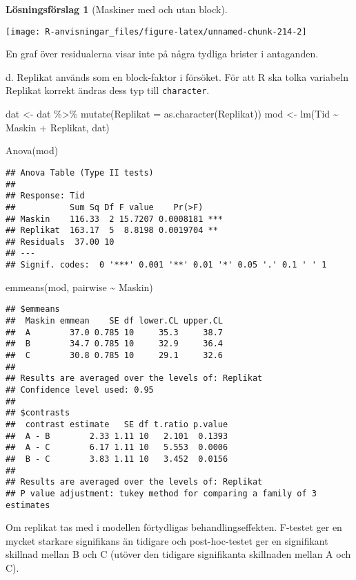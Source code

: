 \documentclass[
]{book}
\newenvironment{Shaded}{\begin{snugshade}}{\end{snugshade}}
\newcommand{\AttributeTok}[1]{\textcolor[rgb]{0.77,0.63,0.00}{#1}}
\newcommand{\FunctionTok}[1]{\textcolor[rgb]{0.00,0.00,0.00}{#1}}
\newcommand{\NormalTok}[1]{#1}
\newcommand{\OtherTok}[1]{\textcolor[rgb]{0.56,0.35,0.01}{#1}}
\newcommand{\SpecialCharTok}[1]{\textcolor[rgb]{0.00,0.00,0.00}{#1}}
\theoremstyle{definition}
\theoremstyle{definition}
\theoremstyle{definition}
\theoremstyle{definition}
\newtheorem{hypothesis}{Lösningsförslag}[chapter]
\theoremstyle{remark}
\begin{document}
\begin{hypothesis}[Maskiner med och utan block]
\begin{center}\texttt{[image: R-anvisningar\_files/figure-latex/unnamed-chunk-214-2]} \end{center}

En graf över residualerna visar inte på några tydliga brister i antaganden.

d. Replikat används som en block-faktor i försöket. För att R ska tolka variabeln Replikat korrekt ändras dess typ till \texttt{character}.

\begin{Shaded}
\begin{Highlighting}[]
\NormalTok{dat }\OtherTok{\textless{}{-}}\NormalTok{ dat }\SpecialCharTok{\%\textgreater{}\%} \FunctionTok{mutate}\NormalTok{(}\AttributeTok{Replikat =} \FunctionTok{as.character}\NormalTok{(Replikat))}
\NormalTok{mod }\OtherTok{\textless{}{-}} \FunctionTok{lm}\NormalTok{(Tid }\SpecialCharTok{\textasciitilde{}}\NormalTok{ Maskin }\SpecialCharTok{+}\NormalTok{ Replikat, dat)}

\FunctionTok{Anova}\NormalTok{(mod)}
\end{Highlighting}
\end{Shaded}

\begin{verbatim}
## Anova Table (Type II tests)
## 
## Response: Tid
##           Sum Sq Df F value    Pr(>F)    
## Maskin    116.33  2 15.7207 0.0008181 ***
## Replikat  163.17  5  8.8198 0.0019704 ** 
## Residuals  37.00 10                      
## ---
## Signif. codes:  0 '***' 0.001 '**' 0.01 '*' 0.05 '.' 0.1 ' ' 1
\end{verbatim}

\begin{Shaded}
\begin{Highlighting}[]
\FunctionTok{emmeans}\NormalTok{(mod, pairwise }\SpecialCharTok{\textasciitilde{}}\NormalTok{ Maskin)}
\end{Highlighting}
\end{Shaded}

\begin{verbatim}
## $emmeans
##  Maskin emmean    SE df lower.CL upper.CL
##  A        37.0 0.785 10     35.3     38.7
##  B        34.7 0.785 10     32.9     36.4
##  C        30.8 0.785 10     29.1     32.6
## 
## Results are averaged over the levels of: Replikat 
## Confidence level used: 0.95 
## 
## $contrasts
##  contrast estimate   SE df t.ratio p.value
##  A - B        2.33 1.11 10   2.101  0.1393
##  A - C        6.17 1.11 10   5.553  0.0006
##  B - C        3.83 1.11 10   3.452  0.0156
## 
## Results are averaged over the levels of: Replikat 
## P value adjustment: tukey method for comparing a family of 3 estimates
\end{verbatim}

Om replikat tas med i modellen förtydligas behandlingseffekten. F-testet ger en mycket starkare signifikans än tidigare och post-hoc-testet ger en signifikant skillnad mellan B och C (utöver den tidigare signifikanta skillnaden mellan A och C).
\end{hypothesis}
\end{document}
